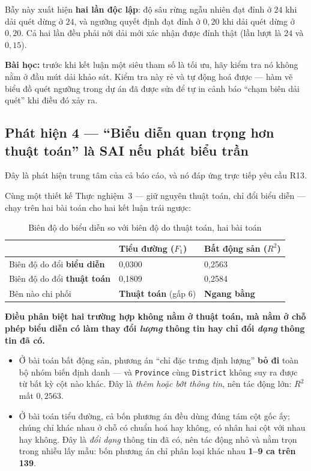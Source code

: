 Bẫy này xuất hiện \textbf{hai lần độc lập}: độ sâu rừng ngẫu nhiên đạt đỉnh ở
$24$ khi dải quét dừng ở $24$, và ngưỡng quyết định đạt đỉnh ở $0{,}20$ khi dải
quét dừng ở $0{,}20$. Cả hai lần đều phải nới dải mới xác nhận được đỉnh thật
(lần lượt là $24$ và $0{,}15$).

\textbf{Bài học:} trước khi kết luận một siêu tham số là tối ưu, hãy kiểm tra nó
không nằm ở đầu mút dải khảo sát. Kiểm tra này rẻ và tự động hoá được --- hàm vẽ
biểu đồ quét ngưỡng trong dự án đã được sửa để tự in cảnh báo ``chạm biên dải
quét'' khi điều đó xảy ra.

\subsection{Phát hiện 4 --- ``Biểu diễn quan trọng hơn thuật toán'' là SAI nếu phát biểu trần}
\label{sec:phanchieu}

Đây là phát hiện trung tâm của cả báo cáo, và nó đáp ứng trực tiếp yêu cầu R13.

Cùng một thiết kế Thực nghiệm~3 --- giữ nguyên thuật toán, chỉ đổi biểu diễn ---
chạy trên hai bài toán cho hai kết luận trái ngược:

\begin{table}[H]
\centering
\caption{Biên độ do biểu diễn so với biên độ do thuật toán, hai bài toán}
\label{tab:biendo-ca-hai}
\small
\begin{tabularx}{\textwidth}{@{}L{5.4cm}R{3.0cm}R{3.2cm}@{}}
\toprule
 & \textbf{Tiểu đường ($F_1$)} & \textbf{Bất động sản ($R^2$)} \\
\midrule
Biên độ do đổi \textbf{biểu diễn}  & 0{,}0300 & 0{,}2563 \\
Biên độ do đổi \textbf{thuật toán} & 0{,}1809 & 0{,}2584 \\
\midrule
Bên nào chi phối & \textbf{Thuật toán} (gấp 6) & \textbf{Ngang bằng} \\
\bottomrule
\end{tabularx}
\end{table}

\textbf{Điều phân biệt hai trường hợp không nằm ở thuật toán, mà nằm ở chỗ phép
biểu diễn có làm thay đổi \emph{lượng} thông tin hay chỉ đổi \emph{dạng} thông
tin đã có.}

\begin{itemize}
  \item Ở bài toán bất động sản, phương án ``chỉ đặc trưng định lượng''
        \textbf{bỏ đi} toàn bộ nhóm biến định danh --- và \texttt{Province} cùng
        \texttt{District} không suy ra được từ bất kỳ cột nào khác. Đây là
        \emph{thêm hoặc bớt thông tin}, nên tác động lớn: $R^2$ mất $0{,}2563$.
  \item Ở bài toán tiểu đường, cả bốn phương án đều dùng đúng tám cột gốc ấy;
        chúng chỉ khác nhau ở chỗ có chuẩn hoá hay không, có nhân hai cột với
        nhau hay không. Đây là \emph{đổi dạng} thông tin đã có, nên tác động nhỏ
        và nằm trọn trong nhiễu lấy mẫu: bốn phương án chỉ phân loại khác nhau
        \textbf{1--9 ca trên 139}.
\end{itemize}

